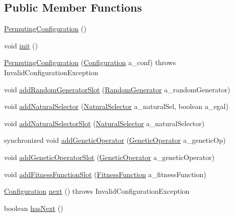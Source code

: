 \subsection*{Public Member Functions}
\begin{DoxyCompactItemize}
\item 
\hyperlink{classorg_1_1jgap_1_1audit_1_1_permuting_configuration_ab87089ed66e80039a5cf5b05b2a288e9}{Permuting\-Configuration} ()
\item 
void \hyperlink{classorg_1_1jgap_1_1audit_1_1_permuting_configuration_ade7f5536b5f5d3023282ad4a02670bfd}{init} ()
\item 
\hyperlink{classorg_1_1jgap_1_1audit_1_1_permuting_configuration_a2ccb4dcfcc9af01b645be257e4dc5d38}{Permuting\-Configuration} (\hyperlink{classorg_1_1jgap_1_1_configuration}{Configuration} a\-\_\-conf)  throws Invalid\-Configuration\-Exception 
\item 
void \hyperlink{classorg_1_1jgap_1_1audit_1_1_permuting_configuration_abdcc8cafe9a702071c19f8598e261bfc}{add\-Random\-Generator\-Slot} (\hyperlink{interfaceorg_1_1jgap_1_1_random_generator}{Random\-Generator} a\-\_\-random\-Generator)
\item 
void \hyperlink{classorg_1_1jgap_1_1audit_1_1_permuting_configuration_a5caee48a9591d7951617e5d0ae4505e8}{add\-Natural\-Selector} (\hyperlink{classorg_1_1jgap_1_1_natural_selector}{Natural\-Selector} a\-\_\-natural\-Sel, boolean a\-\_\-egal)
\item 
void \hyperlink{classorg_1_1jgap_1_1audit_1_1_permuting_configuration_ae1f3f3a56e200d37e271380d2dec90a5}{add\-Natural\-Selector\-Slot} (\hyperlink{classorg_1_1jgap_1_1_natural_selector}{Natural\-Selector} a\-\_\-natural\-Selector)
\item 
synchronized void \hyperlink{classorg_1_1jgap_1_1audit_1_1_permuting_configuration_a20d63e01bc70c09fc24bb05a2f5150c7}{add\-Genetic\-Operator} (\hyperlink{interfaceorg_1_1jgap_1_1_genetic_operator}{Genetic\-Operator} a\-\_\-genetic\-Op)
\item 
void \hyperlink{classorg_1_1jgap_1_1audit_1_1_permuting_configuration_aaf310d9de178a84fd1b9ab8ee897ac67}{add\-Genetic\-Operator\-Slot} (\hyperlink{interfaceorg_1_1jgap_1_1_genetic_operator}{Genetic\-Operator} a\-\_\-genetic\-Operator)
\item 
void \hyperlink{classorg_1_1jgap_1_1audit_1_1_permuting_configuration_adc60b54f40c58275ae3ec4fe30971739}{add\-Fitness\-Function\-Slot} (\hyperlink{classorg_1_1jgap_1_1_fitness_function}{Fitness\-Function} a\-\_\-fitness\-Function)
\item 
\hyperlink{classorg_1_1jgap_1_1_configuration}{Configuration} \hyperlink{classorg_1_1jgap_1_1audit_1_1_permuting_configuration_a541cb4586f480c4991369f04753a2be8}{next} ()  throws Invalid\-Configuration\-Exception 
\item 
boolean \hyperlink{classorg_1_1jgap_1_1audit_1_1_permuting_configuration_aa102c11a1faf9d24191c7b6b85f0ff4e}{has\-Next} ()
\end{DoxyCompactItemize}
